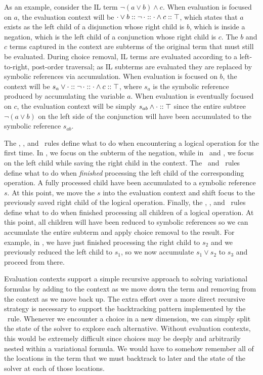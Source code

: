 As an example, consider the IL term $\neg(a\vee b) \wedge c$.
%
When evaluation is focused on $a$, the evaluation context will be
$\inOrL{\inNot{\inAndL{\inRoot}{c}}}{b}$, which states that $a$ exists as the
left child of a disjunction whose right child is $b$, which is inside a
negation, which is the left child of a conjunction whose right child is $c$.
The $b$ and $c$ terms captured in the context are subterms of the original term
that must still be evaluated.
%
During choice removal, IL terms are evaluated according to a left-to-right,
post-order traversal; as IL subterms are evaluated they are replaced by
symbolic references via accumulation.
%
When evaluation is focused on $b$, the context will be
$\inOrR{s_a}{\inNot{\inAndL{\inRoot}{c}}}$, where $s_a$ is the symbolic
reference produced by accumulating the variable $a$.
%
When evaluation is eventually focused on $c$, the evaluation context will be
simply $\inAndR{s_{ab}}{\inRoot}$ since the entire subtree $\neg (a \vee b)$ on
the left side of the conjunction will have been accumulated to the symbolic
reference $s_{ab}$.


The \crNot, \crAnd, and \crOr\ rules define what to do when encountering a
logical operation for the first time. In \crNot, we focus on the subterm of the
negation, while in \crAnd\ and \crOr, we focus on the left child while saving
the right child in the context.
%
The \crAndL\ and \crOrL\ rules define what to do when \emph{finished}
processing the left child of the corresponding operation. A fully processed
child have been accumulated to a symbolic reference $s$. At this point, we move
the $s$ into the evaluation context and shift focus to the previously saved
right child of the logical operation.
%
Finally, the \crNotIn, \crAndR, and \crOrR\ rules define what to do when
finished processing all children of a logical operation. At this point, all
children will have been reduced to symbolic references so we can accumulate the
entire subterm and apply choice removal to the result. For example, in \crAndR,
we have just finished processing the right child to $s_2$ and we previously
reduced the left child to $s_1$, so we now accumulate $s_1\vee s_2$ to $s_3$
and proceed from there.

Evaluation contexts support a simple recursive approach to solving variational
formulas by adding to the context as we move down the term and removing from
the context as we move back up.
%
The extra effort over a more direct recursive strategy is necessary to support
the backtracking pattern implemented by the \crChc\ rule. Whenever we encounter
a choice in a new dimension, we can simply split the state of the solver to
explore each alternative. Without evaluation contexts, this would be extremely
difficult since choices may be deeply and arbitrarily nested within a
variational formula. We would have to somehow remember all of the locations in
the term that we must backtrack to later and the state of the solver at each of
those locations.

